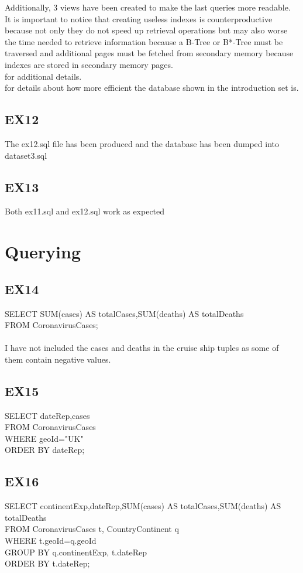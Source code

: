 \documentclass{article}
\begin{document}
Additionally, 3 views have been created to make the last queries more readable.\\It is important to notice that creating useless indexes is counterproductive because not only they do not speed up retrieval operations but may also worse the time needed to retrieve information because a B-Tree or B*-Tree must be traversed and additional pages must be fetched from secondary memory because indexes are stored in secondary memory pages.\\
\textcolor{blue}{} for additional details.\\
\textcolor{blue}{} for details about how more efficient the database shown in the introduction set is.


\subsection{EX12}The ex12.sql file has been produced and the database has been dumped into dataset3.sql
\subsection{EX13} Both ex11.sql and ex12.sql work as expected



\section{Querying}
\subsection{EX14}
 SELECT SUM(cases) AS totalCases,SUM(deaths) AS totalDeaths\\ FROM CoronavirusCases;\\\\
 I have not included the cases and deaths in the cruise ship tuples as some of them contain negative values.
 \subsection{EX15}
SELECT dateRep,cases\\ FROM CoronavirusCases\\ WHERE geoId="UK"\\ ORDER BY dateRep;
\subsection{EX16}
SELECT continentExp,dateRep,SUM(cases) AS totalCases,SUM(deaths) AS totalDeaths\\
FROM CoronavirusCases t, CountryContinent q\\
WHERE t.geoId=q.geoId\\
GROUP BY q.continentExp, t.dateRep\\
ORDER BY t.dateRep;
\end{document}

